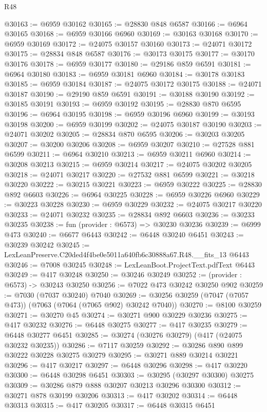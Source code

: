 \begin{lexlean}{R48}
\begin{coremodule}
@30163 := @6959 @30162
@30165 := @28830 @848 @6587
@30166 := @6964 @30165
@30168 := @6959 @30166 @6960
@30169 := @30163 @30168
@30170 := @6959 @30169
@30172 := @24075 @30157 @30160
@30173 := @24071 @30172
@30175 := @28834 @848 @6587
@30176 := @30173 @30175
@30177 := @30170 @30176
@30178 := @6959 @30177
@30180 := @29186 @859 @6591
@30181 := @6964 @30180
@30183 := @6959 @30181 @6960
@30184 := @30178 @30183
@30185 := @6959 @30184
@30187 := @24075 @30172 @30175
@30188 := @24071 @30187
@30190 := @29190 @859 @6591
@30191 := @30188 @30190
@30192 := @30185 @30191
@30193 := @6959 @30192
@30195 := @28830 @870 @6595
@30196 := @6964 @30195
@30198 := @6959 @30196 @6960
@30199 := @30193 @30198
@30200 := @6959 @30199
@30202 := @24075 @30187 @30190
@30203 := @24071 @30202
@30205 := @28834 @870 @6595
@30206 := @30203 @30205
@30207 := @30200 @30206
@30208 := @6959 @30207
@30210 := @27528 @881 @6599
@30211 := @6964 @30210
@30213 := @6959 @30211 @6960
@30214 := @30208 @30213
@30215 := @6959 @30214
@30217 := @24075 @30202 @30205
@30218 := @24071 @30217
@30220 := @27532 @881 @6599
@30221 := @30218 @30220
@30222 := @30215 @30221
@30223 := @6959 @30222
@30225 := @28830 @892 @6603
@30226 := @6964 @30225
@30228 := @6959 @30226 @6960
@30229 := @30223 @30228
@30230 := @6959 @30229
@30232 := @24075 @30217 @30220
@30233 := @24071 @30232
@30235 := @28834 @892 @6603
@30236 := @30233 @30235
@30238 := fun (provider : @6573) => @30230 @30236
@30239 := @6999 @473
@30240 := @6677 @6443
@30242 := @6448 @30240 @6451
@30243 := @30239 @30242
@30245 := LexLeanPreserve.C20ded4f4be0e5011a640fb6c30888a67.R48.__fits_13 @6443
@30246 := @7008 @30245
@30248 := LexLeanBoot.ProjectText.pdfText @6443
@30249 := @417 @30248
@30250 := @30246 @30249
@30252 := (provider : @6573) -> @30243 @30250
@30256 := @7022 @473 @30242 @30250 @902
@30259 := @7030 (@7037 @30240) @7040
@30269 := @30256 @30259 (@7047 (@7057 @473)) (@7063 (@7064 (@7065 @902) @30242 @7040))
@30270 := @8100 @30259
@30271 := @30270 @45
@30274 := @30271 @900 @30229 @30236
@30275 := @417 @30232
@30276 := @6448 @30275
@30277 := @417 @30235
@30279 := @6448 @30277 @6451
@30285 := @30274 (@30276 @30279) (@417 (@24075 @30232 @30235))
@30286 := @7117 @30259
@30292 := @30286 @890 @899 @30222 @30228 @30275 @30279
@30295 := @30271 @889 @30214 @30221
@30296 := @417 @30217
@30297 := @6448 @30296
@30298 := @417 @30220
@30300 := @6448 @30298 @6451
@30303 := @30295 (@30297 @30300) @30275
@30309 := @30286 @879 @888 @30207 @30213 @30296 @30300
@30312 := @30271 @878 @30199 @30206
@30313 := @417 @30202
@30314 := @6448 @30313
@30315 := @417 @30205
@30317 := @6448 @30315 @6451

\end{coremodule}
\end{lexlean}
